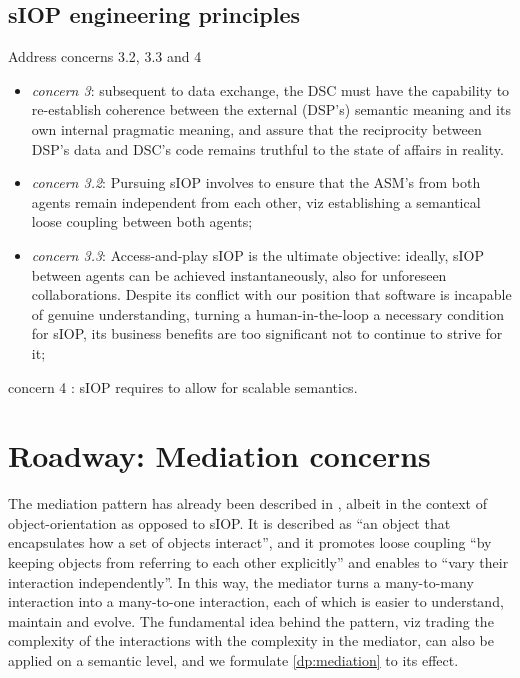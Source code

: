 \documentclass[sort&compress,preprint,authoryear,3p,twocolumn]{elsarticle}
\begin{document}
\hypertarget{siop-engineering-principles}{%
\subsection{sIOP engineering
principles}\label{siop-engineering-principles}}

Address concerns 3.2, 3.3 and 4

\begin{itemize}
\item
  \emph{concern 3}: subsequent to data exchange, the DSC must have the
  capability to re-establish coherence between the external (DSP's)
  semantic meaning and its own internal pragmatic meaning, and assure
  that the reciprocity between DSP's data and DSC's code remains
  truthful to the state of affairs in reality.
\item
  \emph{concern 3.2}: Pursuing sIOP involves to ensure that the ASM's
  from both agents remain independent from each other, viz establishing
  a semantical loose coupling between both agents;
\item
  \emph{concern 3.3}: Access-and-play sIOP is the ultimate objective:
  ideally, sIOP between agents can be achieved instantaneously, also for
  unforeseen collaborations. Despite its conflict with our position that
  software is incapable of genuine understanding, turning a
  human-in-the-loop a necessary condition for sIOP, its business
  benefits are too significant not to continue to strive for it;
\end{itemize}

concern 4 : sIOP requires to allow for scalable semantics.

\hypertarget{roadway-mediation-concerns}{%
\section{Roadway: Mediation concerns}\label{roadway-mediation-concerns}}

The mediation pattern has already been described in \citep{Gamma1994},
albeit in the context of object-orientation as opposed to sIOP. It is
described as ``an object that encapsulates how a set of objects
interact'', and it promotes loose coupling ``by keeping objects from
referring to each other explicitly'' and enables to ``vary their
interaction independently''. In this way, the mediator turns a
many-to-many interaction into a many-to-one interaction, each of which
is easier to understand, maintain and evolve. The fundamental idea
behind the pattern, viz trading the complexity of the interactions with
the complexity in the mediator, can also be applied on a semantic level,
and we formulate \cref{dp:mediation} to its effect.
\end{document}
